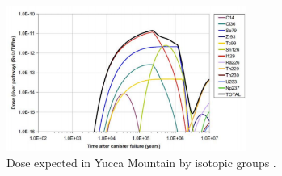 \begin{figure}[htbp!]
  \begin{center}
    \includegraphics[width=0.7\textwidth]{wigeland_dose.eps}
  \end{center}
  \caption{Dose expected in Yucca Mountain by isotopic groups 
    \cite{wigeland_relationship_2010}.}
  \label{fig:wigeland_dose}
\end{figure}
